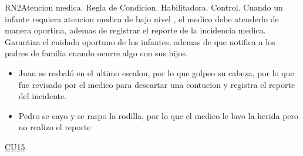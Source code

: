 \begin{BussinesRule}{RN2}{Atencion medica.} 
	\BRitem[Tipo:] Regla de Condicion. 
	\BRitem[Clase:] Habilitadora. 
	\BRitem[Nivel:] Control. %
	\BRitem[Descripción:] Cuando un infante requiera atencion medica de bajo nivel , el medico debe atenderlo de manera oportina, ademas de registrar el reporte de la incidencia medica.
        \BRitem[Motivación:] Garantiza el cuidado oportuno de los infantes, ademas de que notifica a los padres de familia cuando ocurre algo con sus hijos.
                \begin{itemize}
                    \item Juan se resbaló en el ultimo escalon, por lo que golpeo su cabeza, por lo que fue revisado por el medico para descartar una contucion y registra el reporte del incidente.
                \end{itemize}
                \begin{itemize}
                    \item Pedro se cayo y se raspo la rodilla, por lo que el medico le lavo la herida pero no realizo el reporte
	        \end{itemize}
         
	 \hyperlink{CU15}{CU15}.
\end{BussinesRule}

